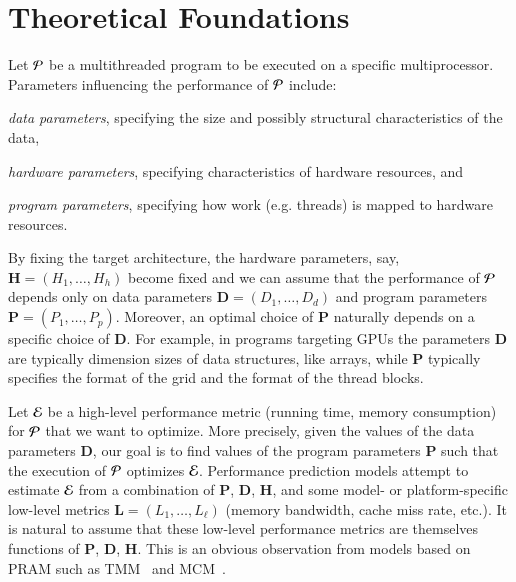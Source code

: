 \chapter{Theoretical Foundations}
\label{ch:foundations}



Let ${\cal P}$ be a multithreaded program to be executed on a specific 
multiprocessor.
Parameters influencing  the performance of ${\cal P}$ include: 
\begin{inparaenum}[(i)]
\item {\em data parameters}, specifying the size and possibly
  structural characteristics of the data, 
\item {\em hardware parameters}, specifying
  characteristics of hardware resources, and
\item {\em program parameters}, specifying
how   work (e.g. threads) is mapped to
  hardware resources.
\end{inparaenum}
By fixing the target architecture, the hardware parameters, say, ${\bm
  H} = \left(H_1, \ldots, H_h\right)$ become fixed and we can assume
that the performance of ${\cal P}$ depends only on data parameters
${\bm D} = \left(D_1, \ldots, D_d\right)$ and program parameters ${\bm
  P} = \left(P_1, \ldots, P_p\right)$.
\ifoldversion Moreover, an optimal choice of ${\bm P}$ naturally
depends on a specific choice of ${\bm D}$.  \fi
For example, in programs targeting GPUs 
the parameters ${\bm D}$ are typically dimension sizes of data
structures, like arrays, while ${\bm P}$ typically specifies the
format of the grid and the format of the thread blocks.


Let ${\cal E}$ be a high-level performance metric (running time, memory consumption)
for ${\cal P}$ that we want to
optimize.  More precisely, given the values of the data parameters
${\bm D}$,  our goal is to find values of the program parameters
${\bm P}$ such that the execution of ${\cal P}$ optimizes
${\cal E}$.  
Performance prediction models attempt to estimate ${\cal E}$ from a
combination of ${\bm P}$, ${\bm D}$, ${\bm H}$, and some model- or
platform-specific low-level metrics ${\bm L} = (L_1, \ldots,
L_\ell)$ (memory bandwidth, cache miss rate, etc.).
It is natural to assume that these low-level performance
metrics are themselves functions of ${\bm P}$, ${\bm D}$, ${\bm
  H}$.  This is an obvious observation from models based on PRAM such
as TMM~\cite{DBLP:journals/fgcs/MaAC14} and
MCM~\cite{DBLP:conf/parco/HaqueMX15}.


